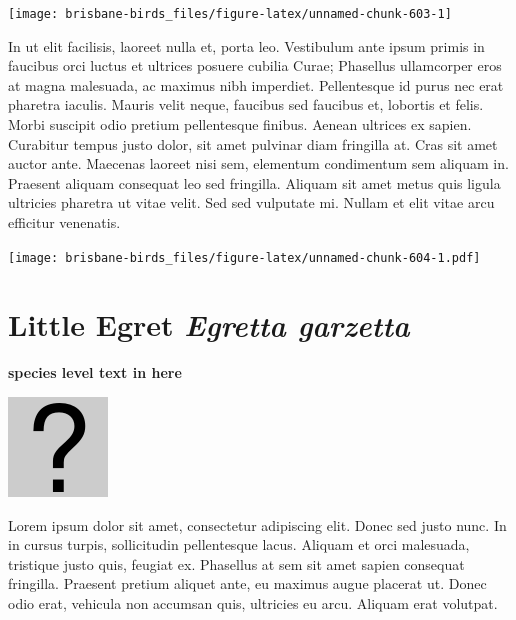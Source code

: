 \documentclass[]{book}
\let\origfigure\figure
\let\endorigfigure\endfigure
\renewenvironment{figure}[1][2] {
  \expandafter\origfigure\expandafter[H]
} {
  \endorigfigure
}
\begin{document}
\begin{figure}
\texttt{[image: brisbane-birds\_files/figure-latex/unnamed-chunk-603-1]} \caption{insert figure caption}\label{fig:unnamed-chunk-603}
\end{figure}

In ut elit facilisis, laoreet nulla et, porta leo. Vestibulum ante ipsum
primis in faucibus orci luctus et ultrices posuere cubilia Curae;
Phasellus ullamcorper eros at magna malesuada, ac maximus nibh
imperdiet. Pellentesque id purus nec erat pharetra iaculis. Mauris velit
neque, faucibus sed faucibus et, lobortis et felis. Morbi suscipit odio
pretium pellentesque finibus. Aenean ultrices ex sapien. Curabitur
tempus justo dolor, sit amet pulvinar diam fringilla at. Cras sit amet
auctor ante. Maecenas laoreet nisi sem, elementum condimentum sem
aliquam in. Praesent aliquam consequat leo sed fringilla. Aliquam sit
amet metus quis ligula ultricies pharetra ut vitae velit. Sed sed
vulputate mi. Nullam et elit vitae arcu efficitur venenatis.

\begin{figure}
\centering
\texttt{[image: brisbane-birds\_files/figure-latex/unnamed-chunk-604-1.pdf]}
\caption{\label{fig:unnamed-chunk-604}insert figure caption}
\end{figure}

\section{\texorpdfstring{Little Egret \emph{Egretta
garzetta}}{Little Egret Egretta garzetta}}\label{little-egret-egretta-garzetta}

\textbf{species level text in here}

\begin{figure}
\centering
\includegraphics{assets/missing.png}
\caption{No image for species}
\end{figure}

Lorem ipsum dolor sit amet, consectetur adipiscing elit. Donec sed justo
nunc. In in cursus turpis, sollicitudin pellentesque lacus. Aliquam et
orci malesuada, tristique justo quis, feugiat ex. Phasellus at sem sit
amet sapien consequat fringilla. Praesent pretium aliquet ante, eu
maximus augue placerat ut. Donec odio erat, vehicula non accumsan quis,
ultricies eu arcu. Aliquam erat volutpat.
\end{document}
